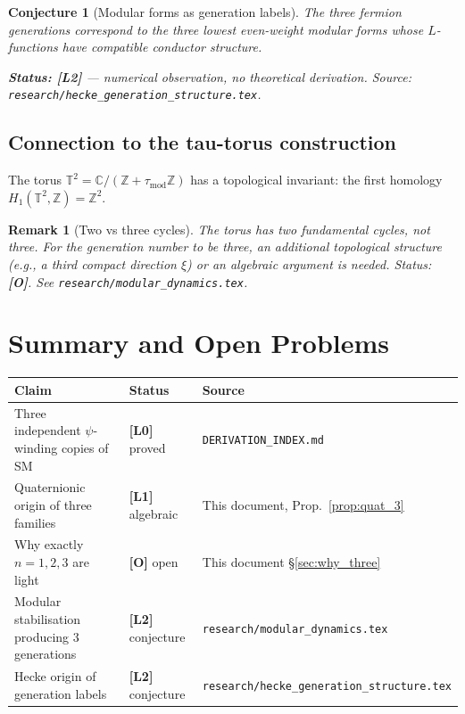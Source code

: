 \documentclass[11pt,a4paper]{article}
\newtheorem{remark}{Remark}
\newtheorem{conjecture}{Conjecture}
\begin{document}
\begin{conjecture}[Modular forms as generation labels]\label{conj:forms}
  The three fermion generations correspond to the three lowest even-weight
  modular forms whose $L$-functions have compatible conductor structure.

  \textbf{Status: [L2]} — numerical observation, no theoretical derivation.
  Source: \texttt{research/hecke\_generation\_structure.tex}.
\end{conjecture}

\subsection{Connection to the tau-torus construction}

The torus $\mathbb{T}^2 = \mathbb{C}/(\mathbb{Z}+\tau_{\mathrm{mod}}\mathbb{Z})$
has a topological invariant: the first homology $H_1(\mathbb{T}^2,\mathbb{Z}) = \mathbb{Z}^2$.

\begin{remark}[Two vs three cycles]
  The torus has two fundamental cycles, not three.  For the generation
  number to be three, an additional topological structure (e.g., a
  third compact direction $\xi$) or an algebraic argument is needed.
  Status: \textbf{[O]}.  See \texttt{research/modular\_dynamics.tex}.
\end{remark}

\section{Summary and Open Problems}
\label{sec:summary}

\begin{center}
\begin{tabular}{lll}
\hline
Claim & Status & Source \\
\hline
Three independent $\psi$-winding copies of SM & \textbf{[L0]} proved &
  \texttt{DERIVATION\_INDEX.md} \\
Quaternionic origin of three families & \textbf{[L1]} algebraic &
  This document, Prop.~\ref{prop:quat_3} \\
Why exactly $n=1,2,3$ are light & \textbf{[O]} open &
  This document §\ref{sec:why_three} \\
Modular stabilisation producing 3 generations & \textbf{[L2]} conjecture &
  \texttt{research/modular\_dynamics.tex} \\
Hecke origin of generation labels & \textbf{[L2]} conjecture &
  \texttt{research/hecke\_generation\_structure.tex} \\
\hline
\end{tabular}
\end{center}
\end{document}
